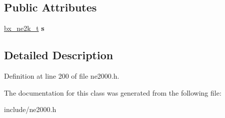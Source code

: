 \subsection*{Public Attributes}
\begin{DoxyCompactItemize}
\item 
\hypertarget{classbx__ne2k__c_af542f5a2962236245c66a3a7c11612a7}{\hyperlink{structbx__ne2k__t}{bx\-\_\-ne2k\-\_\-t} {\bfseries s}}\label{classbx__ne2k__c_af542f5a2962236245c66a3a7c11612a7}

\end{DoxyCompactItemize}


\subsection{Detailed Description}


Definition at line 200 of file ne2000.\-h.



The documentation for this class was generated from the following file\-:\begin{DoxyCompactItemize}
\item 
include/ne2000.\-h\end{DoxyCompactItemize}
